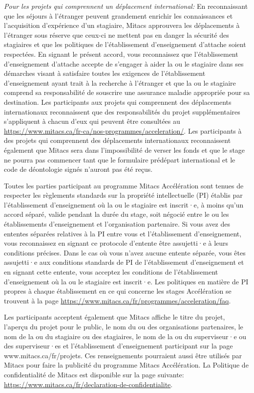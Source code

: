 {\noindent
\textit{Pour les projets qui comprennent un déplacement international:} En reconnaissant que les séjours à l'étranger peuvent grandement enrichir les connaissances et l'acquisition d'expérience d'un stagiaire, Mitacs approuvera les déplacements à l'étranger sous réserve que ceux-ci ne mettent pas en danger la sécurité des stagiaires et que les politiques de l'établissement d'enseignement d'attache soient respectées. En signant le présent accord, vous reconnaissez que l'établissement d'enseignement d'attache accepte de s'engager à aider la ou le stagiaire dans ses démarches visant à satisfaire toutes les exigences de l'établissement d'enseignement ayant trait à la recherche à l'étranger et que la ou le stagiaire comprend sa responsabilité de souscrire une assurance maladie appropriée pour sa destination. Les participants aux projets qui comprennent des déplacements internationaux reconnaissent que des responsabilités du projet supplémentaires s'appliquent à chacun d'eux qui peuvent être consultées au \url{https://www.mitacs.ca/fr-ca/nos-programmes/acceleration/}. Les participants à des projets qui comprennent des déplacements internationaux reconnaissent également que Mitacs sera dans l'impossibilité de verser les fonds et que le stage ne pourra pas commencer tant que le formulaire prédépart international et le code de déontologie signés n'auront pas été reçus.

\noindent
Toutes les parties participant au programme Mitacs Accélération sont tenues de respecter les règlements standards sur la propriété intellectuelle (PI) établis par l'établissement d'enseignement où la ou le stagiaire est inscrit·e, à moins qu'un accord séparé, valide pendant la durée du stage, soit négocié entre le ou les établissements d'enseignement et l'organisation partenaire. Si vous avez des ententes séparées relatives à la PI entre vous et l'établissement d'enseignement, vous reconnaissez en signant ce protocole d'entente être assujetti·e à leurs conditions précises.  Dans le cas où vous n'avez aucune entente séparée, vous êtes assujetti·e aux conditions standards de PI de l'établissement d'enseignement et en signant cette entente, vous acceptez les conditions de l'établissement d'enseignement où la ou le stagiaire est inscrit·e. Les politiques en matière de PI propres à chaque établissement en ce qui concerne les stages Accélération se trouvent à la page \url{https://www.mitacs.ca/fr/programmes/acceleration/faq}.

\noindent
Les participants acceptent également que Mitacs affiche le titre du projet, l'aperçu du projet pour le public, le nom du ou des organisations partenaires, le nom de la ou du stagiaire ou des stagiaires, le nom de la ou du superviseur·e ou des superviseur·es et l'établissement d'enseignement participant sur la page www.mitacs.ca/fr/projets. Ces renseignements pourraient aussi être utilisés par Mitacs pour faire la publicité du programme Mitacs Accélération. La Politique de confidentialité de Mitacs est disponible sur la page suivante: \url{https://www.mitacs.ca/fr/declaration-de-confidentialite}.

}
